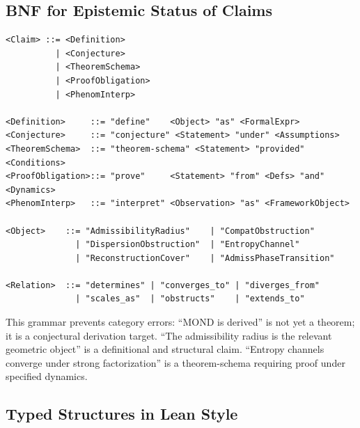 \documentclass[11pt, a4paper]{article}
\theoremstyle{plain}
\theoremstyle{definition}
\theoremstyle{remark}
\begin{document}
\subsection{BNF for Epistemic Status of Claims}

\begin{lstlisting}[caption={BNF grammar for claim classification}]
<Claim> ::= <Definition>
          | <Conjecture>
          | <TheoremSchema>
          | <ProofObligation>
          | <PhenomInterp>

<Definition>     ::= "define"    <Object> "as" <FormalExpr>
<Conjecture>     ::= "conjecture" <Statement> "under" <Assumptions>
<TheoremSchema>  ::= "theorem-schema" <Statement> "provided" <Conditions>
<ProofObligation>::= "prove"     <Statement> "from" <Defs> "and" <Dynamics>
<PhenomInterp>   ::= "interpret" <Observation> "as" <FrameworkObject>

<Object>    ::= "AdmissibilityRadius"    | "CompatObstruction"
              | "DispersionObstruction"  | "EntropyChannel"
              | "ReconstructionCover"    | "AdmissPhaseTransition"

<Relation>  ::= "determines" | "converges_to" | "diverges_from"
              | "scales_as"  | "obstructs"    | "extends_to"
\end{lstlisting}

This grammar prevents category errors: ``MOND is derived'' is not yet a theorem; it
is a conjectural derivation target. ``The admissibility radius is the relevant
geometric object'' is a definitional and structural claim. ``Entropy channels
converge under strong factorization'' is a theorem-schema requiring proof under
specified dynamics.

\subsection{Typed Structures in Lean Style}
\end{document}
